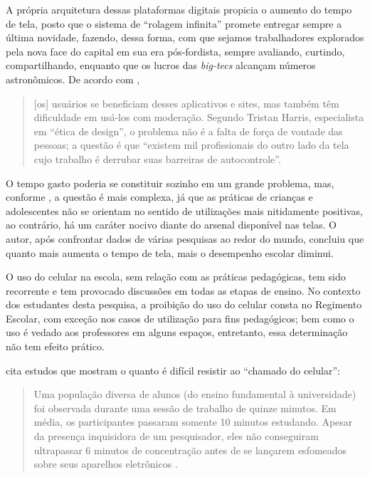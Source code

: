 \documentclass[portuguese]{textolivre}
\begin{document}
A própria arquitetura dessas plataformas digitais propicia o aumento do tempo de tela, posto que o sistema de ``rolagem infinita'' promete entregar sempre a última novidade, fazendo, dessa forma, com que sejamos trabalhadores explorados pela nova face do capital em sua era pós-fordista, sempre avaliando, curtindo, compartilhando, enquanto que os lucros das \textit{big-tecs} alcançam números astronômicos. De acordo com \textcite[p.~11]{alter_irresistivel:_2018},

\begin{quote}
    [os] usuários se beneficiam desses aplicativos e sites, mas também têm dificuldade em usá-los com moderação. Segundo Tristan Harris, especialista em ``ética de design'', o problema não é a falta de força de vontade das pessoas; a questão é que ``existem mil profissionais do outro lado da tela cujo trabalho é derrubar suas barreiras de autocontrole''.
\end{quote}

O tempo gasto poderia se constituir sozinho em um grande problema, mas, conforme \textcite{desmurget_fabrica_2023}, a questão é mais complexa, já que as práticas de crianças e adolescentes não se orientam no sentido de utilizações mais nitidamente positivas, ao contrário, há um caráter nocivo diante do arsenal disponível nas telas. O autor, após confrontar dados de várias pesquisas ao redor do mundo, concluiu que quanto mais aumenta o tempo de tela, mais o desempenho escolar diminui.

O uso do celular na escola, sem relação com as práticas pedagógicas, tem sido recorrente e tem provocado discussões em todas as etapas de ensino. No contexto dos estudantes desta pesquisa, a proibição do uso do celular consta no Regimento Escolar, com exceção nos casos de utilização para fins pedagógicos; bem como o uso é vedado aos professores em alguns espaços, entretanto, essa determinação não tem efeito prático.

\textcite{desmurget_fabrica_2023} cita estudos que mostram o quanto é difícil resistir ao ``chamado do celular'':

\begin{quote}
    Uma população diversa de alunos (do ensino fundamental à universidade) foi observada durante uma sessão de trabalho de quinze minutos. Em média, os participantes passaram somente 10 minutos estudando. Apesar da presença inquisidora de um pesquisador, eles não conseguiram ultrapassar 6 minutos de concentração antes de se lançarem esfomeados sobre seus aparelhos eletrônicos \cite[p.~185]{desmurget_fabrica_2023}.
\end{quote}
\end{document}
